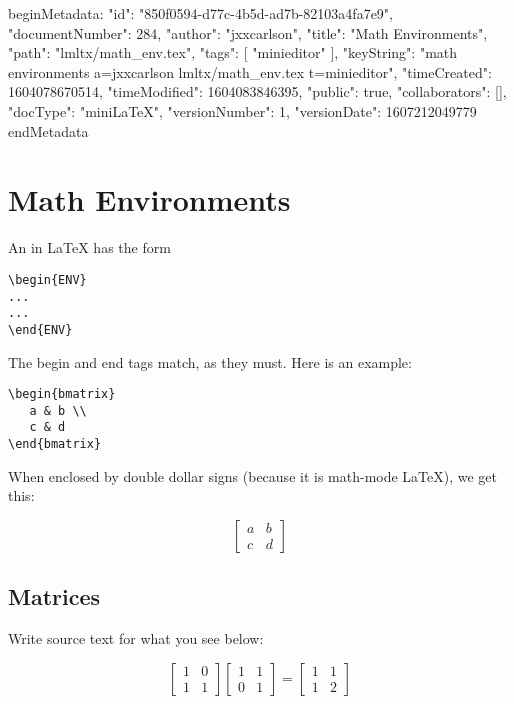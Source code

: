 beginMetadata:
{
    "id": "850f0594-d77c-4b5d-ad7b-82103a4fa7e9",
    "documentNumber": 284,
    "author": "jxxcarlson",
    "title": "Math Environments",
    "path": "lmltx/math_env.tex",
    "tags": [
        "minieditor"
    ],
    "keyString": "math environments a=jxxcarlson lmltx/math_env.tex t=minieditor",
    "timeCreated": 1604078670514,
    "timeModified": 1604083846395,
    "public": true,
    "collaborators": [],
    "docType": "miniLaTeX",
    "versionNumber": 1,
    "versionDate": 1607212049779
}
endMetadata


\setcounter{section}{4}

\section{Math Environments}

\innertableofcontents

An  in LaTeX has the form

\begin{verbatim}
\begin{ENV}
...
...
\end{ENV}
\end{verbatim}

The begin and end tags match, as they must.   Here is an example:

\begin{verbatim}
\begin{bmatrix}
   a & b \\
   c & d
\end{bmatrix}
\end{verbatim}

When enclosed by double dollar signs (because it is math-mode LaTeX), we get this:

$$
\begin{bmatrix}
   a & b \\
   c & d
\end{bmatrix}
$$

\subsection{Matrices}

 Write source text for what you see below:

$$
\begin{bmatrix}
   1 & 0 \\
   1 & 1
\end{bmatrix}
\begin{bmatrix}
   1 & 1 \\
   0 & 1
\end{bmatrix}
=
\begin{bmatrix}
   1 & 1 \\
   1 & 2
\end{bmatrix}
$$

